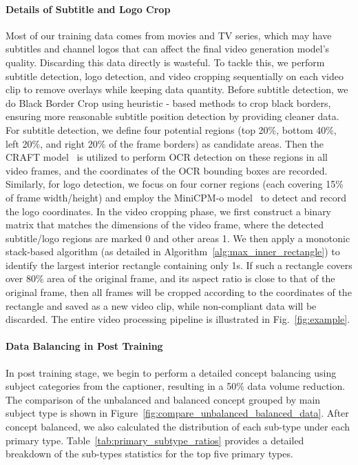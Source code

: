 \documentclass{article}
\begin{document}
{\paragraph{Details of Subtitle and Logo Crop}
Most of our training data comes from movies and TV series, which may have subtitles and channel logos that can affect the final video generation model's quality. Discarding this data directly is wasteful. To tackle this, we perform subtitle detection, logo detection, and video cropping sequentially on each video clip to remove overlays while keeping data quantity.
Before subtitle detection, we do Black Border Crop using heuristic - based methods to crop black borders, ensuring more reasonable subtitle position detection by providing cleaner data. 
For subtitle detection, we define four potential regions (top 20\%, bottom 40\%, left 20\%, and right 20\% of the frame borders) as candidate areas. Then the CRAFT model~\cite{CRAFT} is utilized to perform OCR detection on these regions in all video frames, and the coordinates of the OCR bounding boxes are recorded. Similarly, for logo detection, we focus on four corner regions (each covering 15\% of frame width/height) and employ the MiniCPM-o model~\cite{minicpm} to detect and record the logo coordinates.
In the video cropping phase, we first construct a binary matrix that matches the dimensions of the video frame, where the detected subtitle/logo regions are marked 0 and other areas 1. We then apply a monotonic stack-based algorithm (as detailed in Algorithm~\ref{alg:max_inner_rectangle}) to identify the largest interior rectangle containing only 1s. If such a rectangle covers over 80\% area of the original frame, and its aspect ratio is close to that of the original frame, then all frames will be cropped according to the coordinates of the rectangle and saved as a new video clip, while non-compliant data will be discarded. The entire video processing pipeline is illustrated in Fig.~\ref{fig:example}.



\paragraph{Data Balancing in Post Training}
\label{para:databalnce}
In post training stage, we begin to perform a detailed concept balancing using subject categories from the captioner, resulting in a 50\% data volume reduction. The comparison of the unbalanced and balanced concept grouped by main subject type is shown in Figure~\ref{fig:compare_unbalanced_balanced_data}. After concept balanced, we also calculated the distribution of each sub-type under each primary type. Table~\ref{tab:primary_subtype_ratios} provides a detailed breakdown of the sub-types statistics for the top five primary types.

}
\end{document}
